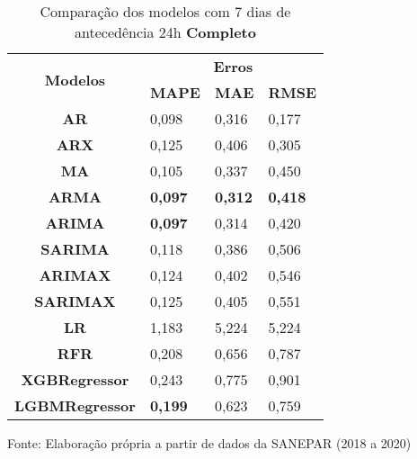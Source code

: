\begin{table}[H]
	\centering
	\caption{Comparação dos modelos com 7 dias de antecedência 24h \textbf{Completo} }\label{tb:10-24cm}
	\begin{tabular}{@{}clll@{}}
		\toprule
		\multirow{2}{*}{\textbf{Modelos}} & \multicolumn{3}{c}{\textbf{Erros}}                                                                       \\ \cmidrule(l){2-4} 
		& \multicolumn{1}{c}{\textbf{MAPE}} & \multicolumn{1}{c}{\textbf{MAE}} & \multicolumn{1}{c}{\textbf{RMSE}} \\ \hline
\textbf{AR}                       & 0,098                             & 0,316                            & 0,177                             \\
\textbf{ARX}                      & 0,125                             & 0,406                            & 0,305                             \\
\textbf{MA}                       & 0,105                             & 0,337                            & 0,450                             \\
\textbf{ARMA}                     & \textbf{0,097}                             & \textbf{0,312}                            & \textbf{0,418}                             \\
\textbf{ARIMA}                    & \textbf{0,097}                             & 0,314                            & 0,420                             \\
\textbf{SARIMA}                   & 0,118                             & 0,386                            & 0,506                             \\
\textbf{ARIMAX}                   & 0,124                             & 0,402                            & 0,546                             \\
\textbf{SARIMAX}                  & 0,125                             & 0,405                            & 0,551                             \\
\textbf{LR}                       & 1,183                             & 5,224                            & 5,224                             \\
\textbf{RFR}                      & 0,208                             & 0,656                            & 0,787                             \\
\textbf{XGBRegressor}             & 0,243                             & 0,775                            & 0,901                             \\
\textbf{LGBMRegressor}            & \textbf{0,199}                             & 0,623                            & 0,759                             \\ \bottomrule
	\end{tabular}

Fonte: Elaboração própria a partir de dados da SANEPAR (2018 a 2020)
\end{table}


